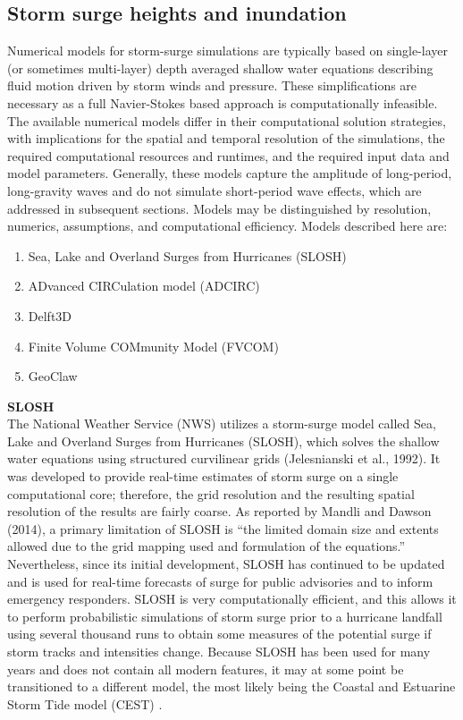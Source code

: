 \subsection{Storm surge heights and inundation}

Numerical models for storm-surge simulations are typically based on single-layer (or sometimes multi-layer) depth averaged shallow water equations describing fluid motion driven by storm winds and pressure. These simplifications are necessary as a full Navier-Stokes based approach is computationally infeasible. The available numerical models differ in their computational solution strategies, with implications for the spatial and temporal resolution of the simulations, the required computational resources and runtimes, and the required input data and model parameters. Generally, these models capture the amplitude of long-period, long-gravity waves and do not simulate short-period wave effects, which are addressed in subsequent sections. Models may be distinguished by resolution, numerics, assumptions, and computational efficiency. Models described here are:

\begin{enumerate}
    \item Sea, Lake and Overland Surges from Hurricanes  (SLOSH)
    \item ADvanced CIRCulation model (ADCIRC)
    \item Delft3D 
    \item Finite Volume COMmunity Model (FVCOM)
    \item GeoClaw
\end{enumerate}

\noindent\textbf{SLOSH} \\The National Weather Service (NWS) utilizes a storm-surge model called Sea, Lake and Overland Surges from Hurricanes (SLOSH), which solves the shallow water equations using structured curvilinear grids (Jelesnianski et al., 1992). It was developed to provide real-time estimates of storm surge on a single computational core; therefore, the grid resolution and the resulting spatial resolution of the results are fairly coarse. As reported by Mandli and Dawson (2014), a primary limitation of SLOSH is “the limited domain size and extents allowed due to the grid mapping used and formulation of the equations.” Nevertheless, since its initial development, SLOSH has continued to be updated and is used for real-time forecasts of surge for public advisories and to inform emergency responders. SLOSH is very computationally efficient, and this allows it to perform probabilistic simulations of storm surge prior to a hurricane landfall using several thousand runs to obtain some measures of the potential surge if storm tracks and intensities change. Because SLOSH has been used for many years and does not contain all modern features, it may at some point be transitioned to a different model, the most likely being the Coastal and Estuarine Storm Tide model (CEST) \citep{zhangTransition2017}. 
\newline

